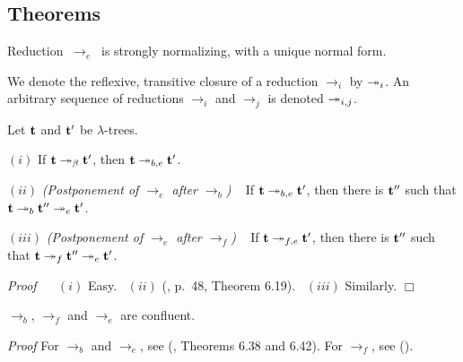 \documentclass[submission,copyright,creativecommons]{eptcs}
\begin{document}
\subsection{Theorems}

\begin{Lem} Reduction $~\rightarrow_e~$ is strongly normalizing, with a unique normal form.
\end{Lem}

We denote the reflexive, transitive closure of a reduction $\rightarrow_i$ by $\twoheadrightarrow_i$. An arbitrary sequence of reductions $\rightarrow_i$ and $\rightarrow_j$ is denoted $\twoheadrightarrow_{i,j}$.

\begin{The}\label{AltThe}
Let ${\bf t}$ and ${\bf t'}$ be $\lambda$-trees.

$(i)$ If ${\bf t} \twoheadrightarrow_\beta {\bf t}'$, then ${\bf t} \twoheadrightarrow_{b,e} {\bf t}'$.


$(ii)$ {\em (Postponement of $\rightarrow_e$ after $\rightarrow_b$)} ~ If ${\bf t} \twoheadrightarrow_{b,e} {\bf t'}$, then there is ${\bf t''}$ such that ${\bf t} \twoheadrightarrow_{b} {\bf t''} \twoheadrightarrow_e {\bf t'}$.

$(iii)$ {\em (Postponement of $\rightarrow_e$ after $\rightarrow_f$)} ~ If ${\bf t} \twoheadrightarrow_{f,e} {\bf t'}$, then there is ${\bf t''}$ such that ${\bf t} \twoheadrightarrow_{f} {\bf t''} \twoheadrightarrow_e {\bf t'}$.
\end{The}
{\it Proof\/} ~~ $(i)$ Easy.~
$(ii)$ (\cite{Ned73}, p.\ 48, Theorem 6.19).~
$(iii)$ Similarly. $\Box$

\begin{The}\label{TheConRed}
$\rightarrow_b$, $\rightarrow_f$ and $\rightarrow_e$ are confluent.
\end{The}
{\it Proof\/} For $\rightarrow_b$ and $\rightarrow_e$, see (\cite{Ned73}, Theorems 6.38 and 6.42). For $\rightarrow_f$, see (\cite{AccKes12}).



\end{document}
